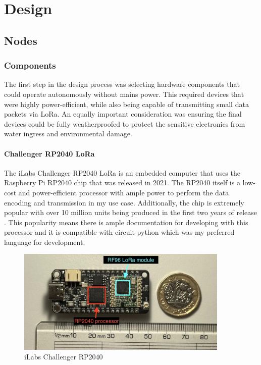 \section{Design}

\subsection{Nodes}

\subsubsection{Components}

The first step in the design process was selecting hardware components that
could operate autonomously without mains power. This required devices that were
highly power-efficient, while also being capable of transmitting small data
packets via LoRa. An equally important consideration was ensuring the final
devices could be fully weatherproofed to protect the sensitive electronics from
water ingress and environmental damage.

\paragraph{Challenger RP2040 LoRa}

The iLabs Challenger RP2040 LoRa is an embedded computer that uses the Raspberry
Pi RP2040 chip that was released in 2021. The RP2040 itself is a low-cost and
power-efficient processor with ample power to perform the data encoding and
transmission in my use case. Additionally, the chip is extremely popular with
over 10 million units being produced in the first two years of release
\cite{pounder2023}. This popularity means there is ample documentation for
developing with this processor and it is compatible with circuit python which
was my preferred language for development.

\begin{figure}[H]
    \centering
    \includegraphics[width=0.9\textwidth]{contents/part-2/fig2/challenger-rp2040.jpg}
    \caption{iLabs Challenger RP2040}
    \label{fig:challenger-rp2040}
\end{figure}

